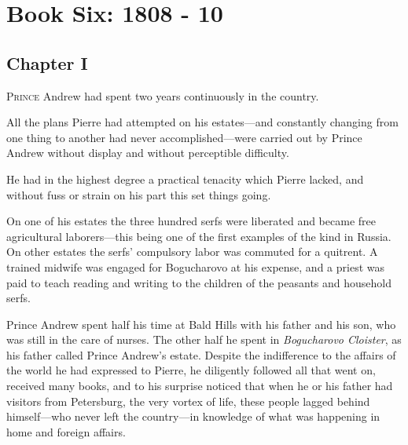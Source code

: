\part*{Book Six: 1808 - 10}


\chapter*{Chapter I}
\ifaudio
{} 
\fi

\lettrine[lines=2, loversize=0.3, lraise=0]{\initfamily P}{rince}
Andrew had spent two years continuously in the country.

All the plans Pierre had attempted on his estates---and
constantly changing from one thing to another had never
accomplished---were carried out by Prince Andrew without display
and without perceptible difficulty.

He had in the highest degree a practical tenacity which Pierre
lacked, and without fuss or strain on his part this set things
going.

On one of his estates the three hundred serfs were liberated and
became free agricultural laborers---this being one of the first
examples of the kind in Russia. On other estates the serfs'
compulsory labor was commuted for a quitrent. A trained midwife
was engaged for Bogucharovo at his expense, and a priest was paid
to teach reading and writing to the children of the peasants and
household serfs.

Prince Andrew spent half his time at Bald Hills with his father
and his son, who was still in the care of nurses. The other half
he spent in \emph{Bogucharovo Cloister}, as his father called
Prince Andrew's estate.  Despite the indifference to the affairs
of the world he had expressed to Pierre, he diligently followed
all that went on, received many books, and to his surprise
noticed that when he or his father had visitors from Petersburg,
the very vortex of life, these people lagged behind himself---who
never left the country---in knowledge of what was happening in
home and foreign affairs.

